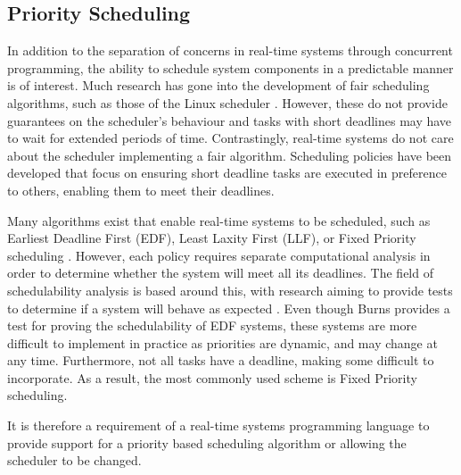 \subsection{Priority Scheduling}
In addition to the separation of concerns in real-time systems through
concurrent programming, the ability to schedule system components in a
predictable manner is of interest. Much research has gone into the development
of fair scheduling algorithms, such as those of the Linux
scheduler \cite{6043273,7280991}. However, these do not provide guarantees on
the scheduler's behaviour and tasks with short deadlines may have to wait for
extended periods of time. Contrastingly, real-time systems do not care about the
scheduler implementing a fair algorithm. Scheduling policies have been
developed that focus on ensuring short deadline tasks are executed in
preference to others, enabling them to meet their deadlines.
\par\bigskip\noindent
Many algorithms exist that enable real-time systems to be
scheduled, such as Earliest Deadline First (EDF), Least Laxity First (LLF), or
Fixed Priority scheduling \cite{real-time-systems}.  However, each policy
requires separate computational analysis in order to determine whether the
system will meet all its deadlines. The field of schedulability analysis is
based around this, with research aiming to provide tests to determine if a
system will behave as expected \cite{4815215,burns-sched-analysis}.  Even though 
Burns provides a test for proving the schedulability of EDF systems, these systems 
are more difficult to implement in practice as priorities are dynamic, and may change
at any time. Furthermore, not all tasks have a deadline, making some
difficult to incorporate. As a result, the most commonly used scheme is Fixed 
Priority scheduling. 
\par\bigskip\noindent
It is therefore a requirement of a real-time systems programming language to provide
support for a priority based scheduling algorithm or allowing the scheduler to
be changed. 

